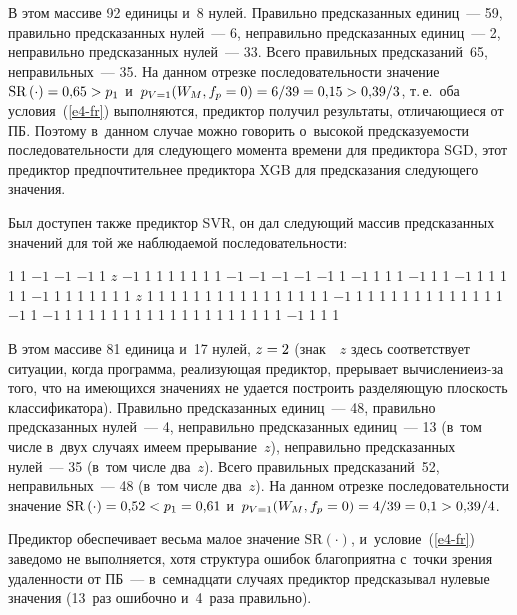 \begin{multicols}{2}
\vspace*{2pt}
  
 \noindent
  В этом массиве 92 единицы и~8 нулей. Правильно предсказанных 
единиц~--- 59, правильно предсказанных нулей~--- 6, неправильно 
предсказанных единиц~--- 2, неправильно предсказанных нулей~--- 33. Всего 
правильных предсказаний~65, неправильных~--- 35. На данном отрезке 
последовательности значение $\mathrm{SR}\,(\cdot) \hm= 0{,}65 \hm> p_1$ 
и~$p_{V=1}(W_M, f_p= 0) \hm= 6/39 \hm= 0{,}15 \hm> 0{,}39/3$, т.\,е.\ оба 
условия~(\ref{e4-fr}) выполняются, предиктор получил результаты, 
отличающиеся от ПБ. 
   Поэтому в~данном случае можно говорить о~высокой предсказуемости 
последовательности для следующего момента времени для предиктора SGD, 
этот предиктор предпочтительнее предиктора XGB для предсказания 
следующего значения.
  
  Был доступен также предиктор SVR, он дал следующий массив 
предсказанных значений для той же наблюдаемой последовательности: 

  1 1  $-1$  $-1$  $-1$ 1  $z$  $-1$  1  1  1  1  1  1  1  $-1$  $-1$   $-1$  $-$1  $-$1
 1  $-1$  1  1  1  $-1$  1  1 $-1$  1  1  1  1  1 $-1$  1  1 1 1  
1 1 
 1  $z$  1  1  1  1  1  1  1 1  1  1  1  1  1  1  1 1 $-1$  1  1
 1  1  1  1  1  1  1  1  1 1  1  $-1$  1 $-1$  1  1 1 1 1 1 1 
 1  1  1  1  1  1  1  1  1 1  1  1  $-1$  1  1  1

\vspace*{2pt}

\noindent
  В этом массиве 81 единица и~17 нулей, $z \hm= 2$ (знак~~$z$ здесь 
соответствует ситуации, когда программа, реализующая предиктор, 
прерывает вы\-чис\-ле\-ние\linebreak из-за того, что на имеющихся значениях не удается 
построить разделяющую плоскость классификатора). Правильно 
предсказанных единиц~--- 48, правильно предсказанных нулей~--- 4, 
неправильно предсказанных единиц~--- 13 (в~том числе в~двух случаях 
имеем прерывание~$z$), неправильно предсказанных нулей~--- 35 (в~том 
числе два~$z$). Всего правильных предсказаний~52, неправильных~--- 48 
(в~том числе два~$z$). На данном отрезке последовательности значение 
$\mathrm{SR}\,(\cdot) \hm= 0{,}52 \hm< p_1= 0{,}61$ и~$p_{V=1}(W_M, f_p= 0) 
\hm= 4/39 \hm= 0{,}1 \hm> 0{,}39/4$.
  
  Предиктор обеспечивает весьма малое значение $\mathrm{SR}(\cdot)$, 
и~условие~(\ref{e4-fr}) заведомо не выполняется, хотя структура ошибок 
благоприятна с~точки зрения удаленности от ПБ~--- в~семнадцати случаях 
предиктор предсказывал нулевые значения (13~раз ошибочно и~4~раза 
правильно).
  

\end{multicols}
